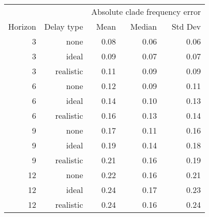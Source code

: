 
\begin{tabular*}{0.7\textwidth}{rrrrr}
\toprule
        &            & \multicolumn{3}{c}{Absolute clade frequency error} \\
Horizon & Delay type & Mean & Median & Std Dev \\
\midrule

3 & none & 0.08 & 0.06 & 0.06 \\
3 & ideal & 0.09 & 0.07 & 0.07 \\
3 & realistic & 0.11 & 0.09 & 0.09 \\
6 & none & 0.12 & 0.09 & 0.11 \\
6 & ideal & 0.14 & 0.10 & 0.13 \\
6 & realistic & 0.16 & 0.13 & 0.14 \\
9 & none & 0.17 & 0.11 & 0.16 \\
9 & ideal & 0.19 & 0.14 & 0.18 \\
9 & realistic & 0.21 & 0.16 & 0.19 \\
12 & none & 0.22 & 0.16 & 0.21 \\
12 & ideal & 0.24 & 0.17 & 0.23 \\
12 & realistic & 0.24 & 0.16 & 0.24 \\

\bottomrule
\end{tabular*}

